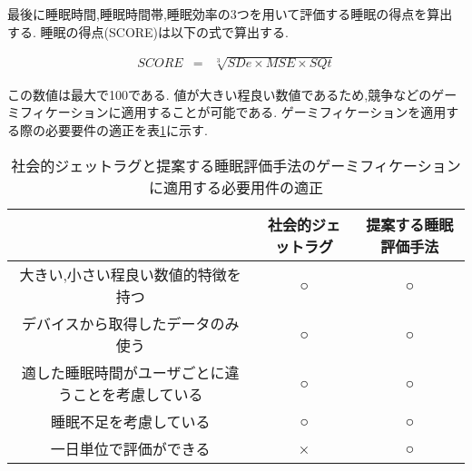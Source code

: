 最後に睡眠時間,睡眠時間帯,睡眠効率の3つを用いて評価する睡眠の得点を算出する.
睡眠の得点(SCORE)は以下の式で算出する.

\begin{eqnarray}
	SCORE & = & \sqrt[3]{SDe × MSE × SQt}
\end{eqnarray}

この数値は最大で100である.
値が大きい程良い数値であるため,競争などのゲーミフィケーションに適用することが可能である.
ゲーミフィケーションを適用する際の必要要件の適正を表\ref{reasonable2}に示す.

\begin{table}[htbp]
	\begin{center}
	\begin{tabular}{|c|c|c|}
  	\hline
  	 & 社会的ジェットラグ & 提案する睡眠評価手法\\
	\hline
	 大きい,小さい程良い数値的特徴を持つ & ○ & ○ \\
	 デバイスから取得したデータのみ使う& ○ & ○ \\
	 適した睡眠時間がユーザごとに違うことを考慮している & ○ & ○ \\
	 睡眠不足を考慮している & ○ & ○ \\
	 一日単位で評価ができる & × & ○ \\
	 \hline
 	\end{tabular}
 	\end{center}
 	\caption{社会的ジェットラグと提案する睡眠評価手法のゲーミフィケーションに適用する必要用件の適正}
 	\label{reasonable2}
\end{table}


